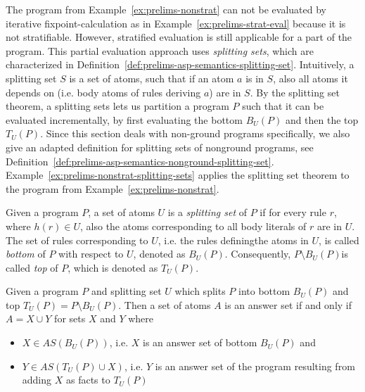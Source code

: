 The program from Example~\ref{ex:prelims-nonstrat} can not be evaluated by iterative fixpoint-calculation as in Example~\ref{ex:prelims-strat-eval} because it is not stratifiable. However, stratified evaluation is still applicable for a part of the program. This partial evaluation approach uses \emph{splitting sets}, which are characterized in Definition~\ref{def:prelims-asp-semantics-splitting-set}. Intuitively, a splitting set $S$ is a set of atoms, such that if an atom $a$ is in $S$, also all atoms it depends on (i.e. body atoms of rules deriving $a$) are in $S$. By the splitting set theorem, a splitting sets lets us partition a program $P$ such that it can be evaluated incrementally, by first evaluating the bottom $B_U(P)$ and then the top $T_U(P)$. Since this section deals with non-ground programs specifically, we also give an adapted definition for splitting sets of nonground programs, see Definition~\ref{def:prelims-asp-semantics-nonground-splitting-set}. Example~\ref{ex:prelims-nonstrat-splitting-sets} applies the splitting set theorem to the program from Example~\ref{ex:prelims-nonstrat}.

\begin{definition}
\label{def:prelims-asp-semantics-splitting-set}
Given a program $P$, a set of atoms $U$ is a \emph{splitting set} of $P$ if for every rule $r$, where $h(r) \in U$, also the atoms corresponding to all body literals of $r$ are in $U$. The set of rules corresponding to $U$, i.e. the rules definingthe atoms in $U$, is called \emph{bottom} of $P$ with respect to $U$, denoted as $B_U(P)$. Consequently, $P \setminus B_U(P)$is called \emph{top} of $P$, which is denoted as $T_U(P)$.\\
\end{definition}

\begin{theorem}
Given a program $P$ and splitting set $U$ which splits $P$ into bottom $B_U(P)$ and top $T_U(P) = P \setminus B_U(P)$. Then a set of atoms $A$ is an answer set if and only if $A = X \cup Y$ for sets $X$ and $Y$ where
\begin{itemize}
	\item $X \in AS(B_U(P))$, i.e. $X$ is an answer set of bottom $B_U(P)$ and
	\item $Y \in AS(T_U(P) \cup X)$, i.e. $Y$ is an answer set of the program resulting from adding $X$ as facts to $T_U(P)$ 
\end{itemize}	
\end{theorem}	

